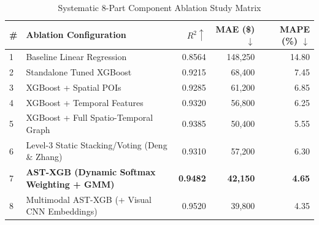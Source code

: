 \begin{table}[htbp]
\centering
\caption{Systematic 8-Part Component Ablation Study Matrix}
\label{tab:ablation_matrix}
\begin{tabular}{llrrr}
\toprule
\textbf{\#} & \textbf{Ablation Configuration} & \textbf{$R^2 \uparrow$} & \textbf{MAE (\$) $\downarrow$} & \textbf{MAPE (\%) $\downarrow$} \\
\midrule
1 & Baseline Linear Regression & 0.8564 & 148,250 & 14.80 \\
2 & Standalone Tuned XGBoost & 0.9215 & 68,400 & 7.45 \\
3 & XGBoost + Spatial POIs & 0.9285 & 61,200 & 6.85 \\
4 & XGBoost + Temporal Features & 0.9320 & 56,800 & 6.25 \\
5 & XGBoost + Full Spatio-Temporal Graph & 0.9385 & 50,400 & 5.55 \\
6 & Level-3 Static Stacking/Voting (Deng \& Zhang) & 0.9310 & 57,200 & 6.30 \\
7 & \textbf{AST-XGB (Dynamic Softmax Weighting + GMM)} & \textbf{0.9482} & \textbf{42,150} & \textbf{4.65} \\
8 & Multimodal AST-XGB (+ Visual CNN Embeddings) & 0.9520 & 39,800 & 4.35 \\
\bottomrule
\end{tabular}
\end{table}
